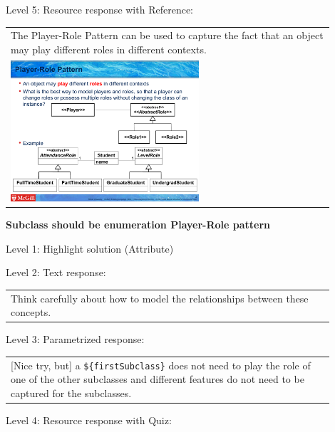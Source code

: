 \noindent Level 5: Resource response with Reference: \medskip

\begin{tabular}{|p{0.9\linewidth}}
The Player-Role Pattern can be used to capture the fact that an object may play different roles
in different contexts.

\\
\includegraphics[width=0.6\textwidth]{images/player_role.png}
\end{tabular} \medskip


\noindent \textbf{Subclass should be enumeration Player-Role pattern} \medskip

\noindent Level 1: Highlight solution (Attribute) \medskip

\noindent Level 2: Text response: \medskip

\begin{tabular}{|p{0.9\linewidth}}
Think carefully about how to model the relationships between these concepts.
\end{tabular} \medskip

\noindent Level 3: Parametrized response: \medskip

\begin{tabular}{|p{0.9\linewidth}}
[Nice try, but] a \verb|${firstSubclass}| does not need to play the role of one of the other subclasses and different features do not need to be captured for the subclasses.
\end{tabular} \medskip

\noindent Level 4: Resource response with Quiz: \medskip


